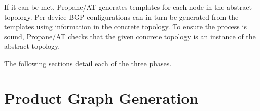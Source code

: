 \documentclass[numbers, 10pt]{sigplanconf}
\newcommand{\ryan}[1]{\textcolor{green}{[ryan: #1]}}
\newcommand{\sysname}{{\text{}\small \sf Propane/AT}\xspace}
\begin{document}
%

If it can be met, \sysname generates templates for each node in the abstract topology.  Per-device BGP configurations can in turn be generated from the templates
using information in the concrete topology. To ensure the process is sound,
\sysname checks that the given concrete topology is an instance of the abstract topology.

The following sections detail each of the three phases.

%
%
%


%
%
%
%

\section{Product Graph Generation}
\label{sec:language}
\end{document}
